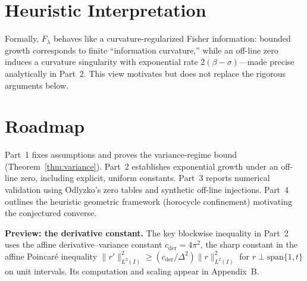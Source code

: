 \section{Heuristic Interpretation}

Formally, $F_\lambda$ behaves like a curvature-regularized Fisher information:
bounded growth corresponds to finite “information curvature,” while an
off-line zero induces a curvature singularity with exponential rate
$2(\beta-\sigma)$—made precise analytically in Part~2.
This view motivates but does not replace the rigorous arguments below.

\section{Roadmap}

Part~1 fixes assumptions and proves the variance-regime bound
(Theorem~\ref{thm:variance}).  
Part~2 establishes exponential growth under an off-line zero,
including explicit, uniform constants.
Part~3 reports numerical validation using Odlyzko’s zero tables and synthetic
off-line injections.  
Part~4 outlines the heuristic geometric framework (horocycle confinement)
motivating the conjectured converse.

\medskip
\noindent\textbf{Preview: the derivative constant.}
The key blockwise inequality in Part~2 uses the affine derivative–variance
constant $c_{\mathrm{der}}=4\pi^2$, the sharp constant in the affine Poincaré
inequality $\|r'\|_{L^2(I)}^2\ge(c_{\mathrm{der}}/\Delta^2)\|r\|_{L^2(I)}^2$ for
$r\perp\mathrm{span}\{1,t\}$ on unit intervals.
Its computation and scaling appear in Appendix~B.